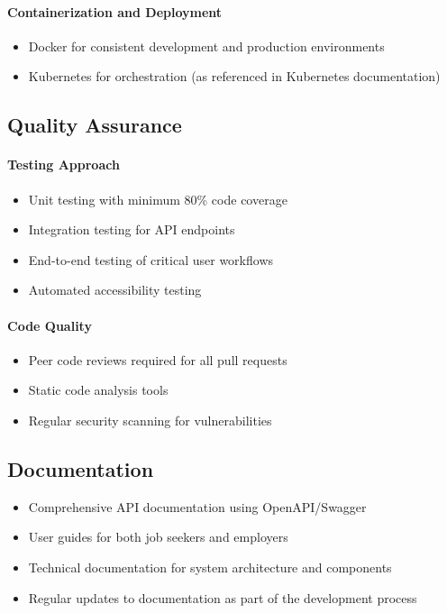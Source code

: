 \documentclass[12pt,a4paper]{article}
\begin{document}
\paragraph{Containerization and Deployment}
\begin{itemize}
    \item Docker for consistent development and production environments
    \item Kubernetes for orchestration (as referenced in Kubernetes documentation)
\end{itemize}

\subsection{Quality Assurance}

\paragraph{Testing Approach}
\begin{itemize}
    \item Unit testing with minimum 80\% code coverage
    \item Integration testing for API endpoints
    \item End-to-end testing of critical user workflows
    \item Automated accessibility testing
\end{itemize}

\paragraph{Code Quality}
\begin{itemize}
    \item Peer code reviews required for all pull requests
    \item Static code analysis tools
    \item Regular security scanning for vulnerabilities
\end{itemize}

\subsection{Documentation}
\begin{itemize}
    \item Comprehensive API documentation using OpenAPI/Swagger
    \item User guides for both job seekers and employers
    \item Technical documentation for system architecture and components
    \item Regular updates to documentation as part of the development process
\end{itemize}
\end{document}
